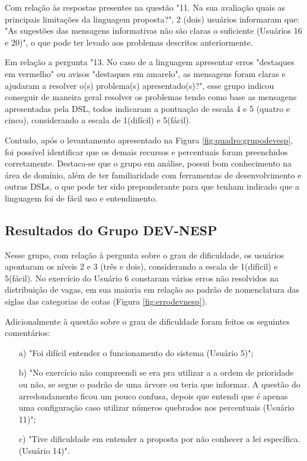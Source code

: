 Com relação às respostas presentes na questão "11. Na sua avaliação quais as principais limitações da linguagem proposta?", 2 (dois) usuários informaram que: "As sugestões das mensagens informativas não são claras o suficiente (Usuários 16 e 20)", o que pode ter levado aos problemas descritos anteriormente.

Em relação a pergunta "13. No caso de a linguagem apresentar erros "destaques em vermelho" ou avisos "destaques em amarelo", as mensagens foram claras e ajudaram a resolver o(s) problema(s) apresentado(s)?", esse grupo indicou conseguir de maneira geral resolver os problemas tendo como base as mensagens apresentadas pela DSL, todos indicaram a pontuação de escala 4 e 5 (quatro e cinco), considerando a escala de 1(difícil) e 5(fácil).

Contudo, após o levantamento apresentado na Figura \ref{fig:quadro:grupodevesp}, foi possível identificar que os demais recursos e percentuais foram preenchidos corretamente. Destaca-se que o grupo em análise, possui bom conhecimento na área de domínio, além de ter familiaridade com ferramentas de desenvolvimento e outras \gls{DSL}s, o que pode ter sido preponderante para que tenham indicado que a linguagem foi de fácil uso e entendimento. 

\newpage
\subsection{Resultados do Grupo DEV-NESP}
\label{subsec:devnesp}

Nesse grupo, com relação à pergunta sobre o grau de dificuldade, os usuários apontaram os níveis 2 e 3 (três e dois), considerando a escala de 1(difícil) e 5(fácil). No exercício do Usuário 6 constaram vários erros não resolvidos na distribuição de vagas, em sua maioria em relação ao padrão de nomenclatura das siglas das categorias de cotas (Figura \ref{fig:errodevnesp}). 



\newpage


Adicionalmente à questão sobre o grau de dificuldade foram feitos os seguintes comentários:

\begin{enumerate}
    \item [a)] "Foi difícil entender o funcionamento do sistema (Usuário 5)";
    \item [b)] "No exercício não compreendi se era pra utilizar a a ordem de prioridade ou não, se segue o padrão de uma árvore ou teria que informar. A questão do arredondamento ficou um pouco confusa, depois que entendi que é apenas uma configuração caso utilizar números quebrados nos percentuais (Usuário 11)";
    \item [c)] "Tive dificuldade em entender a proposta por não conhecer a lei específica.  (Usuário 14)".    
\end{enumerate}

